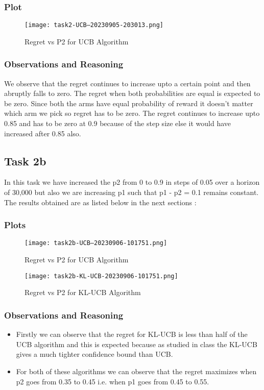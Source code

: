 \documentclass{article}
\begin{document}
\subsubsection{Plot}

\begin{figure}[H]
\centering
\texttt{[image: task2-UCB--20230905-203013.png]}
\caption{Regret vs P2 for UCB Algorithm}
\end{figure}

\subsubsection{Observations and Reasoning}
We observe that the regret continues to increase upto a certain point and then abruptly falls to zero. The regret when both probabilities are equal is expected to be zero. Since both the arms have equal probability of reward it doesn't matter which arm we pick so regret has to be zero. The regret continues to increase upto 0.85 and has to be zero at 0.9 because of the step size else it would have increased after 0.85 also.


\subsection{Task 2b}
In this task we have increased the p2 from 0 to 0.9 in steps of 0.05 over a horizon of 30,000 but also we are increasing p1 such that p1 - p2 = 0.1 remains constant. The results obtained are as listed below in the next sections :

\subsubsection{Plots}

\begin{figure}[H]
\centering
\texttt{[image: task2b-UCB--20230906-101751.png]}
\caption{Regret vs P2 for UCB Algorithm}
\end{figure}

\begin{figure}[H]
\centering
\texttt{[image: task2b-KL-UCB-20230906-101751.png]}
\caption{Regret vs P2 for KL-UCB Algorithm}
\end{figure}

\subsubsection{Observations and Reasoning}
\begin{itemize}
\item Firstly we can observe that the regret for KL-UCB is less than half of the UCB algorithm and this is expected because as studied in class the KL-UCB gives a much tighter confidence bound than UCB.
\item For both of these algorithms we can observe that the regret maximizes when p2 goes from 0.35 to 0.45 i.e. when p1 goes from 0.45 to 0.55.
\end{itemize}
\end{document}
